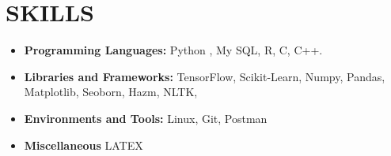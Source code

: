 \documentclass[a4paper,9pt]{extarticle}
\begin{document}
\section*{SKILLS}
\begin{itemize}
    \item \textbf{Programming Languages:} Python , My SQL, R, C, C++. %
    \item \textbf{Libraries and Frameworks:} TensorFlow, Scikit-Learn, Numpy, Pandas, Matplotlib, Seoborn, Hazm, NLTK,  %
    \item \textbf{Environments and Tools:} Linux, Git, Postman %
    \item \textbf{Miscellaneous} LATEX %


\end{itemize}

\end{document}
